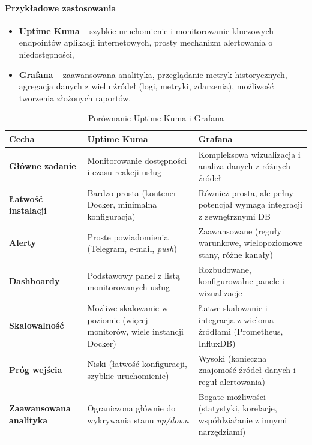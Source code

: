 \documentclass{article}
\begin{document}
\paragraph{Przykładowe zastosowania}
\begin{itemize}
    \item \textbf{Uptime Kuma} -- szybkie uruchomienie i monitorowanie kluczowych endpointów aplikacji internetowych, prosty mechanizm alertowania o niedostępności,
    \item \textbf{Grafana} -- zaawansowana analityka, przeglądanie metryk historycznych, agregacja danych z wielu źródeł (logi, metryki, zdarzenia), możliwość tworzenia złożonych raportów.
\end{itemize}

\begin{table}[H]
\centering
\begin{tabular}{|p{4.5cm}|p{4.5cm}|p{4.5cm}|}
\hline
\textbf{Cecha}                  & \textbf{Uptime Kuma}                                                                 & \textbf{Grafana}                                                         \\ \hline
\textbf{Główne zadanie}         & Monitorowanie dostępności i czasu reakcji usług                                     & Kompleksowa wizualizacja i analiza danych z różnych źródeł               \\ \hline
\textbf{Łatwość instalacji}     & Bardzo prosta (kontener Docker, minimalna konfiguracja)                             & Również prosta, ale pełny potencjał wymaga integracji z zewnętrznymi DB   \\ \hline
\textbf{Alerty}                 & Proste powiadomienia (Telegram, e-mail, \emph{push})                                & Zaawansowane (reguły warunkowe, wielopoziomowe stany, różne kanały)       \\ \hline
\textbf{Dashboardy}             & Podstawowy panel z listą monitorowanych usług                                       & Rozbudowane, konfigurowalne panele i wizualizacje                         \\ \hline
\textbf{Skalowalność}           & Możliwe skalowanie w poziomie (więcej monitorów, wiele instancji Docker)           & Łatwe skalowanie i integracja z wieloma źródłami (Prometheus, InfluxDB)   \\ \hline
\textbf{Próg wejścia}           & Niski (łatwość konfiguracji, szybkie uruchomienie)                                   & Wysoki (konieczna znajomość źródeł danych i reguł alertowania) \\ \hline
\textbf{Zaawansowana analityka} & Ograniczona głównie do wykrywania stanu \emph{up/down}                               & Bogate możliwości (statystyki, korelacje, współdziałanie z innymi narzędziami) \\ \hline
\end{tabular}
\caption{Porównanie Uptime Kuma i Grafana}
\label{tab:porownanie-uptime-kuma-grafana}
\end{table}
\end{document}
